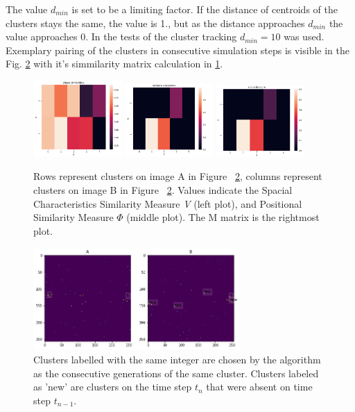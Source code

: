 The value $d_{min}$ is set to be a limiting factor. If the distance of centroids of the clusters stays the same, the value is 1., but as the distance approaches $d_{min}$ the value approaches 0.
In the tests of the cluster tracking $d_{min}=10$ was used.
Exemplary pairing of the clusters in consecutive simulation steps is visible in the Fig. \ref{fig:fin_clus} with it's simmilarity matrix calculation in \ref{fig:sims}.

\begin{figure}[h]
\centering
\includegraphics[width=0.3\textwidth]{figures/chapter4/velopix_clusters/shape.png}
\includegraphics[width=0.3\textwidth]{figures/chapter4/velopix_clusters/distance.png}
\includegraphics[width=0.3\textwidth]{figures/chapter4/velopix_clusters/similarity.png}
\caption{Rows represent clusters on image A in Figure ~\ref{fig:fin_clus}, columns represent clusters on image B in Figure ~\ref{fig:fin_clus}. Values indicate the Spacial Characteristics Similarity Measure \textit{V} (left plot), and Positional Similarity Measure \textit{$\Phi$} (middle plot). The M matrix is the rightmost plot.
}
\label{fig:sims}
\end{figure}



\begin{figure}[H]
\centering
\includegraphics[width=0.7\textwidth]{figures/chapter4/velopix_clusters/paired.png}
\caption{Clusters labelled with the same integer are chosen by the algorithm as the consecutive generations of the same cluster. Clusters labeled as 'new' are clusters on the time step $t_{n}$ that were absent on time step $t_{n-1}$.}
\label{fig:fin_clus}
\end{figure}

